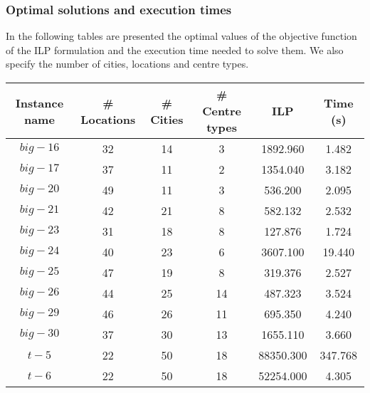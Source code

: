 \subsubsection{Optimal solutions and execution times}
\label{sec:comparative-results:instances:optimal-results}

In the following tables are presented the optimal values of the objective function of the ILP
formulation and the execution time needed to solve them. We also specify the number of cities,
locations and centre types.

\begin{table}[H]
    \centering
    \noindent
    \begin{tabular}{cccccc}
        \toprule
        Instance name & \# Locations & \# Cities & \# Centre types & ILP & Time (s) \\
        
        \midrule
        
        $big-16$    & 32    & 14    & 3     & 1892.960     &   1.482 \\
        $big-17$    & 37    & 11    & 2     & 1354.040     &   3.182 \\
        $big-20$    & 49    & 11    & 3     &  536.200     &   2.095 \\
        $big-21$    & 42    & 21    & 8     &  582.132     &   2.532 \\
        $big-23$    & 31    & 18    & 8     &  127.876     &   1.724 \\
        $big-24$    & 40    & 23    & 6     & 3607.100     &  19.440 \\
        $big-25$    & 47    & 19    & 8     &  319.376     &   2.527 \\
        $big-26$    & 44    & 25    & 14    &  487.323     &   3.524 \\
        $big-29$    & 46    & 26    & 11    &  695.350     &   4.240 \\
        $big-30$    & 37    & 30    & 13    & 1655.110     &   3.660 \\
        
        \midrule
        
        $t-5$       & 22    & 50    & 18    & 88350.300    & 347.768 \\
        $t-6$       & 22    & 50    & 18    & 52254.000    &   4.305 \\
        
        \bottomrule
    \end{tabular}
    \label{table:instances}
\end{table}

